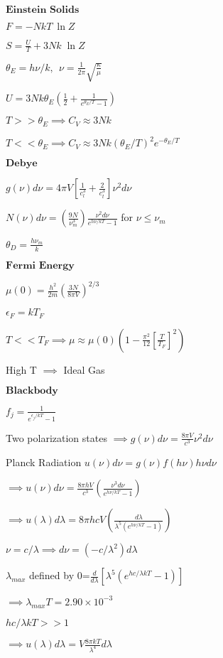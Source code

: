 \documentclass{article}
\begin{document}
\begin{multicols}{3}
$\textbf{Einstein Solids}$

$F= -NkT\:\ln Z$

$S=\frac{U}{T} + 3Nk \;\ln Z$

$\theta_E = h \nu / k, \:\:\nu = \frac{1}{2 \pi} \sqrt{\frac{\kappa}{\mu}}$

$U=3Nk\theta_E (\frac{1}{2}+\frac{1}{e^{\theta_E/T}-1})$

$T>>\theta_E \implies C_V \approx 3Nk$

$T<<\theta_E \implies C_V \approx 3Nk(\theta_E/T)^2 e^{-\theta_E/T}$

$\textbf{Debye}$

$g(\nu)d\nu=4\pi V\left[ \frac{1}{c_l^3} + \frac{2}{c_t^3} \right] \nu^2d\nu$

$N(\nu)d\nu=\left(\frac{9N}{\nu_m^3}\right)\frac{\nu^2d\nu}{e^{h\nu/kT}-1}$ for $\nu \leq \nu_m$

$\theta_D=\frac{h\nu_m}{k}$

$\textbf{Fermi Energy}$

$\mu(0)=\frac{h^2}{2m} \left( \frac{3N}{8\pi V} \right)^{2/3}$

$\epsilon_F=k T_F$

$T<<T_F \implies \mu \approx \mu(0) \left ( 1-\frac{\pi^2}{12} \left[ \frac{T}{T_F} \right]^2 \right)$

High T $\implies$ Ideal Gas

$\textbf{Blackbody}$

$f_j=\frac{1}{e^{\epsilon_j/kT}-1}$

Two polarization states $\implies g(\nu)d\nu=\frac{8\pi V}{c^3}\nu^2d\nu$

Planck Radiation $u(\nu)d\nu=g(\nu)f(h\nu)h\nu d\nu$

$\implies u(\nu)d\nu=\frac{8\pi h V}{c^3} \left ( \frac{\nu^3 d\nu}{e^{h\nu /kT}-1} \right )$

$\implies u(\lambda)d\lambda=8\pi hcV \left ( \frac{d\lambda}{\lambda^5 (e^{h\nu /kT}-1)} \right )$

$\nu=c/\lambda \implies d\nu=(-c/\lambda^2)d\lambda$

$\lambda_{max}$ defined by 0=$\frac{d}{d\lambda}[\lambda^5(e^{hc/\lambda kT}-1)]$

$\implies \lambda_{max}T=2.90 \times 10^{-3}$

$hc/\lambda kT >> 1$

$\implies u(\lambda)d\lambda=V\frac{8\pi kT}{\lambda^4}d\lambda$


\end{multicols}
\end{document}
